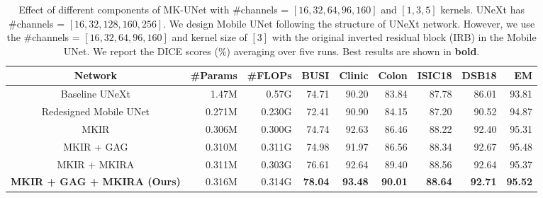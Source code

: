 \begin{table}[t]
\begin{center}
    \begin{adjustbox}{width=0.75\textwidth}
\begin{tabular}{c|r|r|r|r|r|r|r|r}
\toprule
Network     & \#Params & \#FLOPs & BUSI & Clinic & Colon & ISIC18 & DSB18 & EM                    \\
\midrule
Baseline UNeXt          & 1.47M & 0.57G & 74.71 &  90.20 & 83.84 &  87.78 & 86.01 & 93.81    \\
Redesigned Mobile UNet          & 0.271M     & 0.230G     & 72.41  & 90.90 & 84.15 & 87.20 & 90.52 & 94.87  \\
MKIR          & 0.306M    & 0.300G     & 74.74 & 92.63 & 86.46 & 88.22 & 92.40 & 95.31         \\
MKIR + GAG          & 0.310M     & 0.311G    & 74.98  & 91.97 & 86.56 & 88.34 & 92.67 & 95.48     \\
MKIR + MKIRA         & 0.311M    & 0.303G    &  76.61 & 92.64 & 89.40 &  88.56 & 92.64 & 95.37     \\
\textbf{MKIR + GAG + MKIRA (Ours)}        & 0.316M    & 0.314G    & \textbf{78.04} & \textbf{93.48} & \textbf{90.01} & \textbf{88.64} & \textbf{92.71} & \textbf{95.52}       \\
\bottomrule 
\end{tabular}
\end{adjustbox}
\end{center}
\vspace{-0.5cm}
\caption{Effect of different components of MK-UNet with \#channels = $[16,32,64,96,160]$ and $[1,3,5]$ kernels. UNeXt has \#channels = $[16,32,128,160,256]$. We design Mobile UNet following the structure of UNeXt network. However, we use the \#channels = $[16,32,64,96,160]$ and kernel size of $[3]$ with the original inverted residual block (IRB) in the Mobile UNet. We report the DICE scores (\%) averaging over five runs. Best results are shown in \textbf{bold}.}
\vspace{-0.4cm}
\label{tab:ablation_components}
\end{table}


